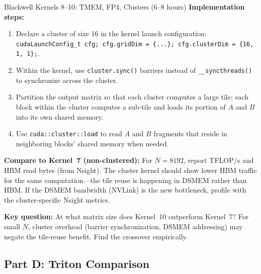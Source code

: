 \begin{exercise}{Blackwell Kernels 8--10: TMEM, FP4, Clusters (6--8 hours)}
\textbf{Implementation steps:}
\begin{enumerate}
  \item Declare a cluster of size 16 in the kernel launch configuration: \texttt{cudaLaunchConfig\_t cfg; cfg.gridDim = \{...\}; cfg.clusterDim = \{16, 1, 1\};}.
  \item Within the kernel, use \texttt{cluster.sync()} barriers instead of \texttt{\_\_syncthreads()} to synchronize across the cluster.
  \item Partition the output matrix so that each cluster computes a large tile; each block within the cluster computes a sub-tile and loads its portion of $A$ and $B$ into its own shared memory.
  \item Use \texttt{cuda::cluster::load} to read $A$ and $B$ fragments that reside in neighboring blocks' shared memory when needed.
\end{enumerate}

\textbf{Compare to Kernel~7 (non-clustered):} For $N = 8192$, report TFLOP/s and HBM read bytes (from Nsight). The cluster kernel should show lower HBM traffic for the same computation---the tile reuse is happening in DSMEM rather than HBM. If the DSMEM bandwidth (NVLink) is the new bottleneck, profile with the cluster-specific Nsight metrics.

\textbf{Key question:} At what matrix size does Kernel~10 outperform Kernel~7? For small $N$, cluster overhead (barrier synchronization, DSMEM addressing) may negate the tile-reuse benefit. Find the crossover empirically.
\end{exercise}

\subsection{Part D: Triton Comparison}

